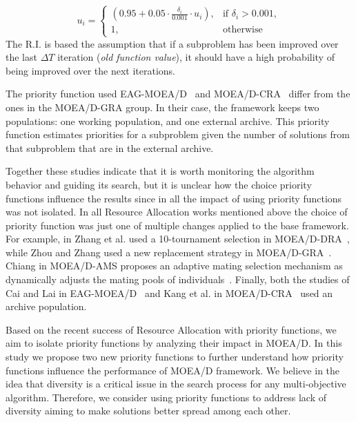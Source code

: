 \[
u_i= 
\begin{cases}

(0.95 + 0.05 \cdot \frac{\delta_i}{0.001} \cdot u_i), & \text{if } \delta_i > 0.001,
\\
1,              & \text{otherwise}

\end{cases}\label{priority2}
\]
The R.I. is based the assumption that if a subproblem has been improved over the last $\Delta T$ iteration (\textit{old function value}), it should have a high probability of being improved over the next iterations. 
	
The priority function used EAG-MOEA/D~\cite{cai2015external} and MOEA/D-CRA~\cite{kang2018collaborative} differ from the ones in the MOEA/D-GRA group. In their case, the framework keeps two populations: one working population, and one external archive. This priority function estimates priorities for a subproblem given the number of solutions from that subproblem that are in the external archive.

Together these studies indicate that it is worth monitoring the algorithm behavior and guiding its search, but it is unclear how the choice priority functions influence the results since in all the impact of using priority functions was not isolated. In all Resource Allocation works mentioned above the choice of priority function was just one of multiple changes applied to the base framework. For example, in Zhang et al. used a 10-tournament selection in MOEA/D-DRA~\cite{zhang2009performance}, while Zhou and Zhang used a new replacement strategy in MOEA/D-GRA~\cite{zhou2016all}. Chiang in MOEA/D-AMS proposes an adaptive mating selection mechanism as dynamically adjusts the mating pools of individuals~\cite{chiang2011moea}. Finally, both the studies of Cai and Lai in  EAG-MOEA/D~\cite{cai2015external} and Kang et al. in MOEA/D-CRA~\cite{kang2018collaborative} used an archive population.

Based on the recent success of Resource Allocation with priority functions, we aim to isolate priority functions by analyzing their impact in MOEA/D. In this study we propose two new priority functions to further understand how priority functions influence the performance of MOEA/D framework. We believe in the idea that diversity is a critical issue in the search process for any multi-objective algorithm. Therefore, we consider using priority functions to address lack of diversity aiming to make solutions better spread among each other.

